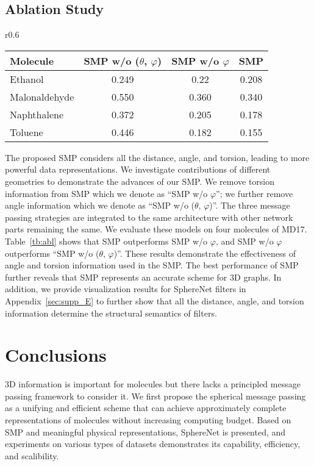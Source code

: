 \documentclass{article}
\begin{document}
\subsection{Ablation Study}

\begin{wraptable}[9]{r}{0.6\textwidth}
\vspace{-20pt} \centering 
\caption{Comparisons among three message passing strategies
on the same SphereNet architecture
on the partial MD17 dataset.
}\label{tb:abl}
\setlength{\tabcolsep}{1.6mm}
\begin{tabular}{lc c c}
\bottomrule Molecule &  SMP w/o ($\theta$, $\varphi$)&   SMP w/o $\varphi$ 
& SMP\\
\hline
Ethanol &  0.249& 0.22& 0.208\\
Malonaldehyde  &  0.550& 0.360& 0.340\\
Naphthalene &  0.372& 0.205& 0.178\\
Toluene  &  0.446& 0.182& 0.155\\
\bottomrule
\end{tabular}
\end{wraptable}
The proposed SMP considers all the distance, angle, and torsion, leading to more powerful data representations.
We investigate contributions of different geometries to demonstrate the advances of our SMP.
We remove torsion information from SMP which we denote as
``SMP w/o $\varphi$'';
we further remove angle information which we denote as
``SMP w/o ($\theta$, $\varphi$)''.
The three message passing strategies are integrated to the same architecture with other network parts remaining the same.
We evaluate these models on four molecules 
of MD17.
Table~\ref{tb:abl} shows
that SMP outperforms SMP w/o $\varphi$, and SMP w/o $\varphi$
outperforms ``SMP w/o ($\theta$, $\varphi$)''.
These results demonstrate the effectiveness of angle and torsion information used in the SMP.
The best performance of SMP further reveals
that SMP represents an accurate scheme for 3D graphs.
In addition, we provide visualization results
for SphereNet filters in Appendix~\ref{sec:supp_E}
to further show that
all the distance, angle, and torsion information
determine the structural semantics of filters.





\section{Conclusions} \label{sec:conc}
3D information is important for molecules
but there lacks a principled message passing framework to consider it.
We first propose the
spherical message passing as a unifying and efficient
scheme that can achieve approximately complete representations of molecules
without increasing computing budget.
Based on SMP and meaningful physical representations,
SphereNet is presented,
and experiments on various types of datasets demonstrates its
capability, efficiency, and scalibility.
\end{document}
